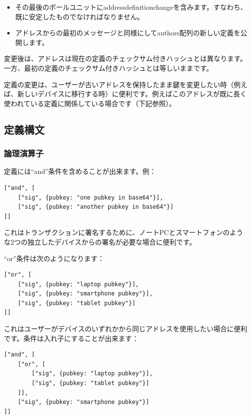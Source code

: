 \documentclass[a4paper, dvipdfmx]{jsarticle}
\begin{document}
\begin{itemize}
    \item その最後のボールユニットにaddress\textunderscore definition\textunderscore changeを含みます。すなわち、既に安定したものでなければなりません。
    \item アドレスからの最初のメッセージと同様にしてauthors配列の新しい定義を公開します。
\end{itemize}

変更後は、アドレスは現在の定義のチェックサム付きハッシュとは異なります。一方、最初の定義のチェックサム付きハッシュとは等しいままです。

定義の変更は、ユーザーが古いアドレスを保持したまま鍵を変更したい時（例えば、新しいデバイスに移行する時）に便利です。例えばこのアドレスが既に長く使われている定義に関係している場合です（下記参照）。

\subsection{定義構文}

\subsubsection{論理演算子}
定義には“and”条件を含めることが出来ます。例：

\begin{lstlisting}[basicstyle=\ttfamily\footnotesize, frame=none]
["and", [
    ["sig", {pubkey: "one pubkey in base64"}],
    ["sig", {pubkey: "another pubkey in base64"}]
]]
\end{lstlisting}

\noindent これはトランザクションに署名するために、ノートPCとスマートフォンのような2つの独立したデバイスからの署名が必要な場合に便利です。

“or”条件は次のようになります：

\begin{lstlisting}[basicstyle=\ttfamily\footnotesize, frame=none]
["or", [
    ["sig", {pubkey: "laptop pubkey"}],
    ["sig", {pubkey: "smartphone pubkey"}],
    ["sig", {pubkey: "tablet pubkey"}]
]]
\end{lstlisting}

これはユーザーがデバイスのいずれかから同じアドレスを使用したい場合に便利です。条件は入れ子にすることが出来ます：

\begin{lstlisting}[basicstyle=\ttfamily\footnotesize, frame=none]
["and", [
    ["or", [
        ["sig", {pubkey: "laptop pubkey"}],
        ["sig", {pubkey: "tablet pubkey"}]
    ]],
    ["sig", {pubkey: "smartphone pubkey"}]
]]
\end{lstlisting}
\end{document}
